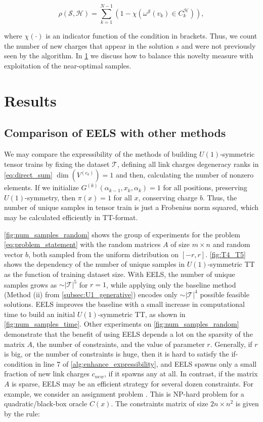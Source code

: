 \documentclass{article}
\theoremstyle{plain}
\theoremstyle{definition}
\theoremstyle{remark}
\begin{document}
\begin{equation}
    \rho(\mathcal{S}, \mathcal{H}) = \sum_{k=1}^{N-1}\left(1 - \chi(\omega^{\mathcal{S}} (v_k) \in C_k^{\mathcal{H}})\right),
\label{eq:graph_distance}
\end{equation}

where $\chi(\cdot)$ is an indicator function of the condition in brackets. Thus, we count the number of new charges that appear in the solution $s$ and were not previously seen by the algorithm. In \cref{sec:results} we discuss how to balance this novelty measure with exploitation of the near-optimal samples.

\section{Results}
\label{sec:results}

\subsection{Comparison of EELS with other methods}
\label{subsec:eels_res}
We may compare the expressibility of the methods of building $U(1)$-symmetric tensor trains by fixing the dataset $\mathcal{T}$, defining all link charges degeneracy ranks in \eqref{eq:direct_sum} $\dim(V^{(c_k)}) = 1$ and then, calculating the number of nonzero elements. 
If we initialize $G^{(k)}(\alpha_{k-1}, x_k, \alpha_k)= 1$ for all positions, preserving $U(1)$-symmetry, then $\pi(x)=1$ for all $x$, conserving charge $b$. Thus, the number of unique samples in tensor train is just a Frobenius norm squared, which may be calculated efficiently in TT-format.

\cref{fig:num_samples_random} shows the group of experiments for the problem \eqref{eq:problem_statement} with the random matrices $A$ of size $m\times n$ and random vector $b$, both sampled from the uniform distribution on $[-r, r]$. \cref{fig:T4_T5} shows the dependency of the number of unique samples in $U(1)$-symmetric TT as the function of training dataset size. With EELS, the number of unique samples grows as $\sim|\mathcal{T}|^5$ for $r=1$, while applying only the baseline method (Method (ii) from \cref{subsec:U1_generative}) encodes only $\sim|\mathcal{T}|^4$ possible feasible solutions. EELS improves the baseline with a small increase in computational time to build an initial $U(1)$-symmetric TT, as shown in \cref{fig:num_samples_time}. Other experiments on \cref{fig:num_samples_random} demonstrate that the benefit of using EELS depends a lot on the sparsity of the matrix $A$, the number of constraints, and the value of parameter $r$. Generally, if $r$ is big, or the number of constraints is huge, then it is hard to satisfy the if-condition in line 7 of \cref{alg:enhance_expressibility}, and EELS spawns only a small fraction of new link charges $c_{new}$, if it spawns any at all. 
In contrast, if the matrix $A$ is sparse, EELS may be an efficient strategy for several dozen constraints. For example, we consider an assignment problem \cite{koopmans1957assignment}. This is NP-hard problem for a quadratic/black-box oracle  $C(x)$. The constraints matrix of size $2n \times n^2$ is given by the rule:
\end{document}

